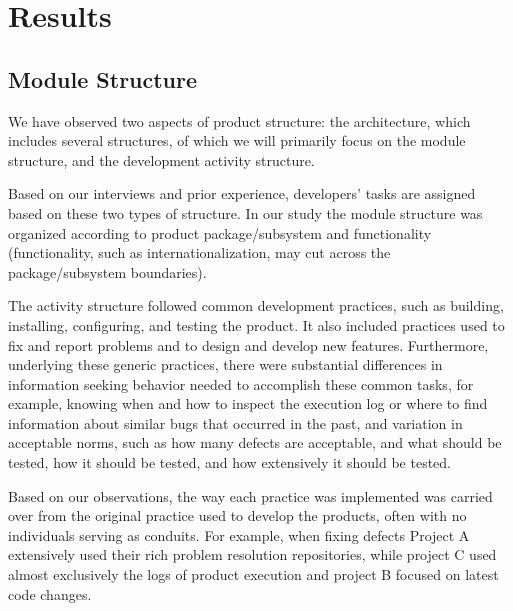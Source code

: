 \documentclass{sig-alternate-05-2015}
\begin{document}

\section{Results}\label{s:result}


\subsection{Module Structure}
We have observed two aspects of product structure: the architecture, 
which includes several structures, of which we will primarily focus 
on the module structure, and the development activity structure. 

Based on our interviews and prior experience, developers' tasks are 
assigned based on these two types of structure. In our study the 
module structure was organized according to product package/subsystem 
and functionality (functionality, such as internationalization, may cut 
across the package/subsystem boundaries). 

The activity structure followed common development practices, such as 
building, installing, configuring, and testing the product. It also 
included practices used to fix and report problems and to design and 
develop new features. Furthermore, underlying these generic practices, 
there were substantial differences in information seeking behavior needed 
to accomplish these common tasks, for example, knowing when and how to 
inspect the execution log or where to find information about similar bugs 
that occurred in the past, and variation in acceptable norms, such as how 
many defects are acceptable, and what should be tested, how it should be 
tested, and how extensively it should be tested. 

Based on our observations, the way each practice was implemented was carried 
over from the original practice used to develop the products, often with no 
individuals serving as conduits. For example, when fixing defects Project A 
extensively used their rich problem resolution repositories, while project C 
used almost exclusively the logs of product execution and project B focused 
on latest code changes. 
\end{document}
